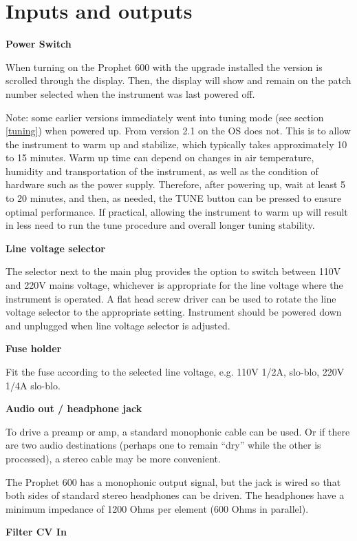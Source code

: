 \documentclass[draft,landscape, 11pt, oneside]{report}
\newenvironment{flowtext}{\addmargin[0cm]{7cm}}{\endaddmargin} %
\begin{document}
\begin{flowtext}
\section{Inputs and outputs}

\textbf{Power Switch}

When turning on the Prophet 600 with the upgrade installed the version is scrolled through the display. Then, the display will show and remain on the patch number selected when the instrument was last powered off.

Note: some earlier versions immediately went into tuning mode (see section \ref{tuning})  when powered up. From version 2.1 on the OS does not. This is to allow the instrument to warm up and stabilize, which typically takes approximately 10 to 15 minutes. Warm up time can depend on changes in air temperature, humidity and transportation of the instrument, as well as the condition of hardware such as the power supply. Therefore, after powering up, wait at least 5 to 20 minutes, and then, as needed, the TUNE button can be pressed to ensure optimal performance. If practical, allowing the instrument to warm up will result in less need to run the tune procedure and overall longer tuning stability.

\textbf{Line voltage selector}

The selector next to the main plug provides the option to switch between 110V and 220V mains voltage, whichever is appropriate for the line voltage where the instrument is operated. A flat head screw driver can be used to rotate the line voltage selector to the appropriate setting. Instrument should be powered down and unplugged when line voltage selector is adjusted.

\textbf{Fuse holder}

Fit the fuse according to the selected line voltage, e.g. 110V 1/2A, slo-blo, 220V 1/4A slo-blo.

\textbf{Audio out / headphone jack}

To drive a preamp or amp, a standard monophonic cable can be used. Or if there are two audio destinations (perhaps one to remain “dry” while the other is processed), a stereo cable may be more convenient.

The Prophet 600 has a monophonic output signal, but the jack is wired so that both sides of standard stereo headphones can be driven. The headphones have a minimum impedance of 1200 Ohms per element (600 Ohms in parallel).

\textbf{Filter CV In}


\end{flowtext}
\end{document}
